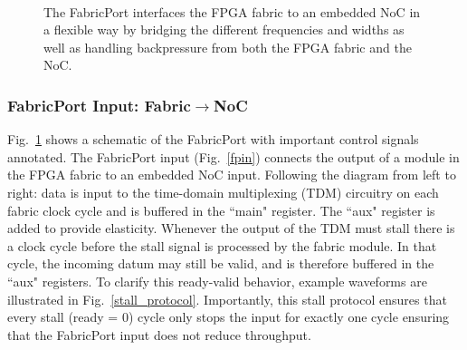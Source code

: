 \begin{figure}[t]
\centering
{}
 \\
\caption{The FabricPort interfaces the FPGA fabric to an embedded NoC in a flexible way by bridging the different frequencies and widths as well as handling backpressure from both the FPGA fabric and the NoC.}
\label{fabric_port}
\end{figure}

\subsubsection{FabricPort Input: Fabric$\rightarrow$NoC}

Fig.~\ref{fabric_port} shows a schematic of the FabricPort with important control signals annotated.
The FabricPort input (Fig.~\ref{fpin}) connects the output of a module in the FPGA fabric to an embedded NoC input.
Following the diagram from left to right: data is input to the time-domain multiplexing (TDM) circuitry on each fabric clock cycle and is buffered in the ``main" register.
The ``aux" register is added to provide elasticity. Whenever the output of the TDM must stall there is a clock cycle before the stall signal is processed by the fabric module. 
In that cycle, the incoming datum may still be valid, and is therefore buffered in the ``aux" registers.
To clarify this ready-valid behavior, example waveforms are illustrated in Fig.~\ref{stall_protocol}.
Importantly, this stall protocol ensures that every stall (ready = 0) cycle only stops the input for exactly one cycle ensuring that the FabricPort input does not reduce throughput.

